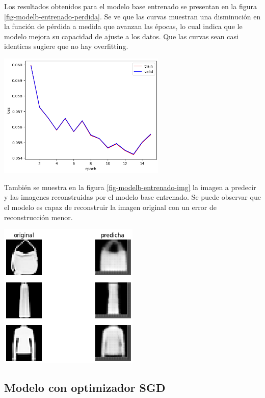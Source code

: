 \documentclass[aps,prl,reprint,groupedaddress]{revtex4-2}
\newenvironment{Figura}
  {\par\medskip\noindent\minipage{\linewidth}}
  {\endminipage\par\medskip}
\begin{document}
Los resultados obtenidos para el modelo base entrenado se presentan en la figura
\ref{fig-modelb-entrenado-perdida}. Se ve que las curvas muestran una 
disminución en la función de pérdida a medida que avanzan las épocas, lo cual 
indica que le modelo mejora su capacidad de ajuste a los datos. Que las curvas 
sean casi identicas sugiere que no hay overfitting.
\begin{Figura}
  \centering
  \includegraphics[width=0.60\textwidth]{figs/modelo_original.png}
  \label{fig-modelb-entrenado-perdida}
\end{Figura}

También se muestra en la figura \ref{fig-modelb-entrenado-img} la imagen a
predecir y las imagenes reconstruidas por el modelo base entrenado. Se puede
observar que el modelo es capaz de reconstruir la imagen original con un error
de reconstrucción menor.
\begin{Figura}
  \centering
  \includegraphics[width=0.5\textwidth]{figs/test_modelo_original.png}
  \label{fig-modelb-entrenado-img}
\end{Figura}

\subsection{Modelo con optimizador SGD}
\end{document}

